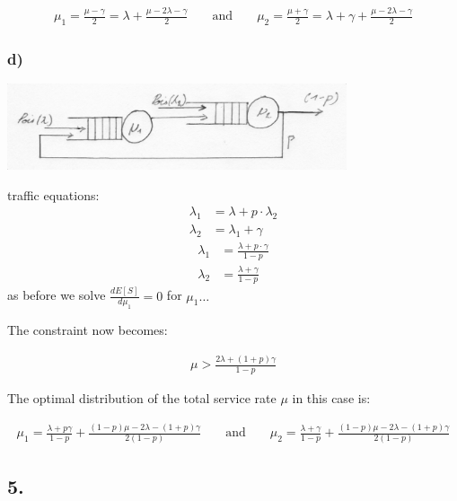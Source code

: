 \begin{align*}
\mu _ { 1 } = \frac { \mu - \gamma } { 2 } = \lambda + \frac { \mu - 2 \lambda - \gamma } { 2 } && \text{ and } &&
\mu _ { 2 } = \frac { \mu + \gamma } { 2 } = \lambda + \gamma + \frac { \mu - 2 \lambda - \gamma } { 2 }
\end{align*}

\subsubsection*{d)}

\includegraphics[width=0.75\textwidth]{pics/Ex09_jackson_net_4d.jpg}

traffic equations:
\begin{align*}
\lambda _{1}&=\lambda +p\cdot \lambda _{2}\\
\lambda _{2}&=\lambda _{1}+\gamma 
\end{align*}
\begin{align*}
\lambda _{1}&=\frac{\lambda +p\cdot \gamma }{1-p}\\
\lambda _{2}&=\frac{\lambda +\gamma }{1-p}
\end{align*}
as before we solve $\frac{dE\left[S\right]}{d\mu _{1}}=0$ for $\mu _{1} \ldots$

The constraint now becomes:

\begin{align*}
\mu > \frac { 2 \lambda + ( 1 + p ) \gamma } { 1 - p }
\end{align*}

The optimal distribution of the total service rate $\mu$ in this case is:

\begin{align*}
\mu _ { 1 } = \frac { \lambda + p \gamma } { 1 - p } + \frac { ( 1 - p ) \mu - 2 \lambda - ( 1 + p ) \gamma } { 2 ( 1 - p ) } && \text{ and } && \mu _ { 2 } = \frac { \lambda + \gamma } { 1 - p } + \frac { ( 1 - p ) \mu - 2 \lambda - ( 1 + p ) \gamma } { 2 ( 1 - p ) }
\end{align*}

\subsection*{5.}

